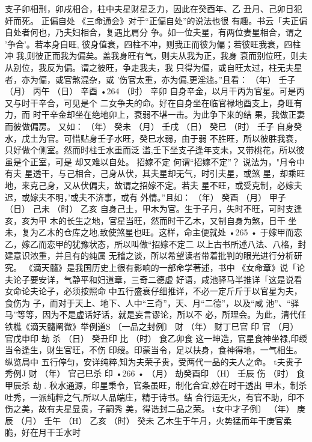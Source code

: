 支子卯相刑，卯戌相合，柱中夫星财星乏力，因此在癸酉年、乙
丑月、己卯日犯奸而死。
正偏自处 《三命通会》对于“正偏自处”的说法也很
有趣。书云「夫正偏自处者何也，乃夫妇相合，复遇比肩分
争。如一位夫星，有两位妻星相合，谓之 '争合'。若本身自旺,
彼身值衰，四柱不冲，则我正而彼为偏；若彼旺我衰，四柱冲
我,则彼正而我为偏矣。盖我身旺有气，则夫从我为正，我身
衰而别位旺，则夫从别位，我反为偏。谓之彼旺，争走我夫，我
只得为偏，或自旺太过，柱无夫星者，亦为偏，或官煞混杂，或
'伤官太重，亦为偏,更淫滥。”且看：
（年） 壬子
（月） 丙午
（日） 辛酉
•264
（时） 辛卯
自身辛金，以月干丙为官星。可是丙又与时干辛合，可见是个
二女争夫的命。好在自身坐在临官禄地酉支上，身旺有力，而
时干辛金却坐在绝地卯上，衰弱不堪一击。为此争下来的结
果，我做正妻而彼做偏房。
又如：
（年） 癸未
（月） 壬戌
（日） 癸巳
（时） 壬子
自身癸水，戊土为官。可惜贴身壬子水旺，癸巳水弱，由于弱
不胜旺，所以彼胜我衰，只好做个侧室。然而时柱壬水重而泛
滥,壬下坐支子逢年支未，又带桃花，所以彼虽是个正室，可是
却又难以自处。
招嫁不定 何谓“招嫁不定”？ 说法为，"月令中有夫
星透干，与己相合，己身从伏，其夫星却无气，时引夫星，或煞
星，却乘旺地，来克己身，又从伏偏夫，故谓之招嫁不定。若夫
星不旺，或受克制，必嫁夫迟，或嫁夫不明，'或夫不济事，或有
外情。”且如：
（年） 癸酉
（月） 甲子
（日） 己未
（时） 乙亥
自身己土，甲木为官。生于子月，失时不旺，可时支逢亥，亥为甲
木的长生之地，官星当旺，然而时干乙木，又制自身为煞，日干
坐未，复为乙木的仓库之地,致使煞星也旺。这样，命主便就处
•265 •
于嫁甲而恋乙，嫁乙而恋甲的犹豫状态，所以叫做“招嫁不定二
以上古书所述八法、八格，封建意识浓重，并且有的纯属
无稽之谈，所以希望读者带着批判的眼光进行分析研究。
《滴天髓》是我国历史上很有影响的一部命学著述，书中
《女命章》说「论夫论子要安详，气静平和妇道章，三奇二德虚
好语，咸池驿马半推详「这是说看女命论夫论子，必须按照命
中五行盛衰仔细推详，不必一定斤斤于以官星为夫，食伤为
子，而对于天上、地下、人中“三奇”，天、月“二德”，以及“咸
池”、“驿马”等等，因为不是虚话好话，就是妄言谬论，所以不
必，所理会。为此，清代任铁樵《滴天髓阐微》举例道S
〔一品之封例〕
财
（年） 财丁巳官
印
官
（月） 官戊申印
劫
杀
（日） 癸丑印
比
（时） 食乙卯食
这一坤造，官星食神坐禄,印绶当令逢生，财生官旺，不伤
印绶。印蒙当令，足以扶身，食神得地，一气相生。纵览局中
五行停匀，安详纯粹,知为夫荣子贵，受两代一品的夫人之命。
t夫贵子秀例J
财
（年） 官己巳杀
印
•266 •
（月） 劫癸酉印
（H） 壬辰
伤
（时） 食甲辰杀
劫 .
秋水通源，印星秉令，官条虽旺，制化合宜,妙在时干透出
甲木，制杀吐秀，一派纯粹之气,所以人品端庄，精于诗书。结
合行运无火，有官不助，印不伤之美，故有夫星显贵，子嗣秀
美，得诰封二品之荣。
t女中才子例〕
（年） 庚辰
（月） 壬午
（H） 乙亥
（时） 癸未
乙木生于午月，火势猛而年干庚官柔脆，好在月干壬水时

